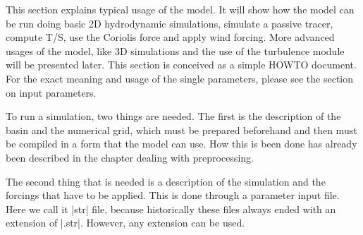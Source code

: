 
%
%
%
%
%
%
%

This section explains typical usage of the model. It will show how
the model can be run doing basic 2D hydrodynamic simulations, simulate
a passive tracer, compute T/S, use the Coriolis force and apply wind
forcing. More advanced usages of the model, like 3D simulations and the
use of the turbulence module will be presented later. This section is
conceived as a simple HOWTO document. For the exact meaning and usage
of the single parameters, please see the section on input parameters.

To run a simulation, two things are needed. The first is the description
of the basin and the numerical grid, which must be prepared beforehand and
then must be compiled in a form that the model can use. How this is been
done has already been described in the chapter dealing with preprocessing.

The second thing that is needed is a description of the simulation and the
forcings that have to be applied. This is done through a parameter input
file. Here we call it |str| file, because historically these files always
ended with an extension of |.str|. However, any extension can be used.

